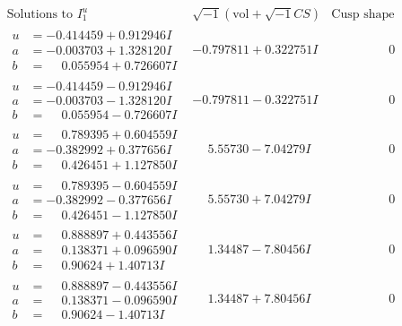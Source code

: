 \documentclass[1p]{elsarticle_modified}
\theoremstyle{definition}
\newcommand{\I}{\sqrt{-1}}
\begin{document}
$$\begin{array}{c|c|c}  
\text{Solutions to }I^u_{1}& \I (\text{vol} + \sqrt{-1}CS) & \text{Cusp shape}\\
 \hline 
\begin{aligned}
u &= -0.414459 + 0.912946 I \\
a &= -0.003703 + 1.328120 I \\
b &= \phantom{-}0.055954 + 0.726607 I\end{aligned}
 & -0.797811 + 0.322751 I & \phantom{-0.000000 } 0 \\ \hline\begin{aligned}
u &= -0.414459 - 0.912946 I \\
a &= -0.003703 - 1.328120 I \\
b &= \phantom{-}0.055954 - 0.726607 I\end{aligned}
 & -0.797811 - 0.322751 I & \phantom{-0.000000 } 0 \\ \hline\begin{aligned}
u &= \phantom{-}0.789395 + 0.604559 I \\
a &= -0.382992 + 0.377656 I \\
b &= \phantom{-}0.426451 + 1.127850 I\end{aligned}
 & \phantom{-}5.55730 - 7.04279 I & \phantom{-0.000000 } 0 \\ \hline\begin{aligned}
u &= \phantom{-}0.789395 - 0.604559 I \\
a &= -0.382992 - 0.377656 I \\
b &= \phantom{-}0.426451 - 1.127850 I\end{aligned}
 & \phantom{-}5.55730 + 7.04279 I & \phantom{-0.000000 } 0 \\ \hline\begin{aligned}
u &= \phantom{-}0.888897 + 0.443556 I \\
a &= \phantom{-}0.138371 + 0.096590 I \\
b &= \phantom{-}0.90624 + 1.40713 I\end{aligned}
 & \phantom{-}1.34487 - 7.80456 I & \phantom{-0.000000 } 0 \\ \hline\begin{aligned}
u &= \phantom{-}0.888897 - 0.443556 I \\
a &= \phantom{-}0.138371 - 0.096590 I \\
b &= \phantom{-}0.90624 - 1.40713 I\end{aligned}
 & \phantom{-}1.34487 + 7.80456 I & \phantom{-0.000000 } 0 \\ \hline\begin{aligned}

\end{aligned}
\end{array}$$
\end{document}

